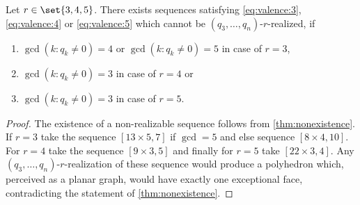 \begin{corollary}
  Let $r \in \set{3, 4, 5}$. There exists sequences satisfying \autoref{eq:valence:3}, \autoref{eq:valence:4} or \autoref{eq:valence:5} which cannot be $(q_3, \dots, q_n)$-$r$-realized, if 
  \begin{enumerate}[label=(\roman*)]
    \item $\gcd (k : q_k \neq 0) = 4$ or $\gcd (k : q_k \neq 0) = 5$ in case of $r = 3$, 
    \item $\gcd (k : q_k \neq 0) = 3$ in case of $r = 4$ or 
    \item $\gcd (k : q_k \neq 0) = 3$ in case of $r = 5$. 
  \end{enumerate}
  \begin{proof}
The existence of a non-realizable sequence follows from \autoref{thm:nonexistence}. If $r=3$ take the sequence $[13 \times 5, 7]$ if $\gcd = 5$ and else sequence $[8 \times 4, 10]$. For $r=4$ take the sequence $[9 \times 3, 5]$ and finally for $r=5$ take $[22 \times 3, 4]$. Any $(q_3, \dots, q_n)$-$r$-realization of these sequence would produce a polyhedron which, perceived as a planar graph, would have exactly one exceptional face, contradicting the statement of \autoref{thm:nonexistence}.
  \end{proof}
\end{corollary}
